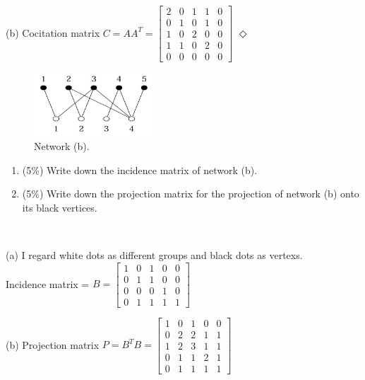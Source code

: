 \documentclass[12pt]{article}
\newcommand {\bsolution}{\noindent {\em Solution:} \ }
\newcommand{\esolution}{\hfill $\Diamond$ \\ \vspace{.3cm}}
\begin{document}
(b) Cocitation matrix $C = AA^{T} = \begin{bmatrix}
	2 & 0 & 1 & 1 & 0 \\
	0 & 1 & 0 & 1 & 0 \\
	1 & 0 & 2 & 0 & 0 \\
	1 & 1 & 0 & 2 & 0 \\
	0 & 0 & 0 & 0 & 0
\end{bmatrix}$
\esolution

\begin{figure}[h]
	\centering
	\includegraphics[width=0.4\textwidth]{NS_Hw1_b.jpg}
	\caption{Network (b).}
	\label{NS_Hw1_b}
\end{figure}

\begin{enumerate}[label=(\alph*)]
	\item (5\%) Write down the incidence matrix of network (b).
	\item (5\%) Write down the projection matrix for the projection of network (b) onto its black vertices.
\end{enumerate}

\bsolution

(a) I regard white dots as different groups and black dots as vertexs.\\
	Incidence matrix = $B = \begin{bmatrix}
	1 & 0 & 1 & 0 & 0 \\
	0 & 1 & 1 & 0 & 0 \\
	0 & 0 & 0 & 1 & 0 \\
	0 & 1 & 1 & 1 & 1 
\end{bmatrix}$


(b) Projection matrix $P = B^{T}B =\begin{bmatrix}
	1 & 0 & 1 & 0 & 0 \\
	0 & 2 & 2 & 1 & 1 \\
	1 & 2 & 3 & 1 & 1 \\
	0 & 1 & 1 & 2 & 1 \\
	0 & 1 & 1 & 1 & 1
	\end{bmatrix} $
\end{document}
